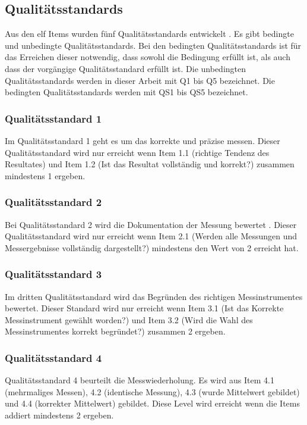 \subsection{Qualitätsstandards}
Aus den elf Items wurden fünf Qualitätsstandards entwickelt \citep{Hild2014a}. Es gibt bedingte und unbedingte Qualitätsstandards. Bei den bedingten Qualitätsstandards ist für das Erreichen dieser notwendig, dass sowohl die Bedingung erfüllt ist, als auch dass der vorgängige Qualitätsstandard erfüllt ist. Die unbedingten Qualitätsstandards werden in dieser Arbeit mit Q1 bis Q5 bezeichnet. Die bedingten Qualitätsstandards werden mit QS1 bis QS5 bezeichnet.
\subsubsection*{Qualitätsstandard 1}
Im Qualitätsstandard 1 geht es um das korrekte und präzise messen. Dieser Qualitätsstandard wird nur erreicht wenn Item 1.1 (richtige Tendenz des Resultates) und Item 1.2 (Ist das Resultat vollständig und korrekt?) zusammen mindestens 1 ergeben.


\subsubsection*{Qualitätsstandard 2}
Bei Qualitätsstandard 2 wird die Dokumentation der Messung bewertet . Dieser Qualitätsstandard wird nur erreicht wenn Item 2.1 (Werden alle Messungen und Messergebnisse vollständig dargestellt?) mindestens den Wert von 2 erreicht hat. 

\subsubsection*{Qualitätsstandard 3}
Im dritten Qualitätsstandard wird das Begründen des richtigen Messinstrumentes bewertet. Dieser Standard wird nur erreicht wenn Item 3.1 (Ist das Korrekte Messinstrument gewählt worden?) und Item 3.2 (Wird die Wahl des Messinstrumentes korrekt begründet?) zusammen 2 ergeben.

\subsubsection*{Qualitätsstandard 4}
Qualitätsstandard 4 beurteilt die Messwiederholung. Es wird aus Item 4.1 (mehrmaliges Messen), 4.2 (identische Messung), 4.3 (wurde Mittelwert gebildet) und 4.4 (korrekter Mittelwert) gebildet. Diese Level wird erreicht wenn die Items addiert mindestens 2 ergeben.

